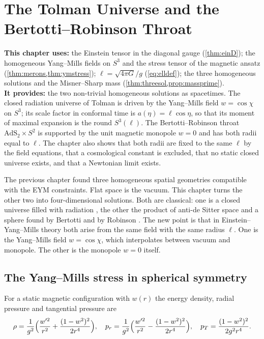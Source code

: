 \chapter{The Tolman Universe and the Bertotti--Robinson Throat}
\label{ch:tolmanbr}

\begin{usesbox}
\textbf{This chapter uses:} the Einstein tensor in the diagonal gauge (\cref{thm:einD}); the homogeneous Yang--Mills fields on $S^3$ and the stress tensor of the magnetic ansatz (\cref{thm:merons,thm:ymstress}); $\ell=\sqrt{4\pi G}/g$ (\eqref{eq:elldef}); the three homogeneous solutions and the Misner--Sharp mass (\cref{thm:threesol,prop:massprime}).\\
\textbf{It provides:} the two non-trivial homogeneous solutions as spacetimes. The closed radiation universe of Tolman is driven by the Yang--Mills field $w=\cos\chi$ on $S^3$; its scale factor in conformal time is $a(\eta)=\ell\cos\eta$, so that its moment of maximal expansion is the round $S^3(\ell)$. The Bertotti--Robinson throat $\mathrm{AdS}_2\times S^2$ is supported by the unit magnetic monopole $w=0$ and has both radii equal to $\ell$. The chapter also shows that both radii are fixed to the same $\ell$ by the field equations, that a cosmological constant is excluded, that no static closed universe exists, and that a Newtonian limit exists.
\end{usesbox}

The previous chapter found three homogeneous spatial geometries compatible with the EYM constraints. Flat space is the vacuum. This chapter turns the other two into four-dimensional solutions. Both are classical: one is a closed universe filled with radiation \cite{Tolman1934}, the other the product of anti-de Sitter space and a sphere found by Bertotti and by Robinson \cite{Bertotti1959,Robinson1959}. The new point is that in Einstein--Yang--Mills theory both arise from the same field with the same radius $\ell$. One is the Yang--Mills field $w=\cos\chi$, which interpolates between vacuum and monopole. The other is the monopole $w=0$ itself.

\section{The Yang--Mills stress in spherical symmetry}

For a static magnetic configuration with $w(r)$ the energy density, radial pressure and tangential pressure are
\begin{equation}\label{eq:ymfluid}
\rho=\frac{1}{g^2}\Bigl(\frac{w'^2}{r^2}+\frac{(1-w^2)^2}{2r^4}\Bigr),\quad
p_r=\frac{1}{g^2}\Bigl(\frac{w'^2}{r^2}-\frac{(1-w^2)^2}{2r^4}\Bigr),\quad
p_T=\frac{(1-w^2)^2}{2g^2r^4}.
\end{equation}

